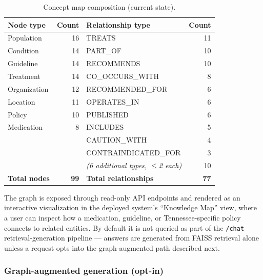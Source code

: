 \documentclass[11pt]{article}
\begin{document}
\begin{table}[h]
\centering
\caption{Concept map composition (current state).}
\label{tab:graph}
\begin{tabular}{lr@{\hspace{2.5em}}lr}
\toprule
Node type & Count & Relationship type & Count \\
\midrule
Population & 16 & TREATS & 11 \\
Condition & 14 & PART\_OF & 10 \\
Guideline & 14 & RECOMMENDS & 10 \\
Treatment & 14 & CO\_OCCURS\_WITH & 8 \\
Organization & 12 & RECOMMENDED\_FOR & 6 \\
Location & 11 & OPERATES\_IN & 6 \\
Policy & 10 & PUBLISHED & 6 \\
Medication & 8 & INCLUDES & 5 \\
 & & CAUTION\_WITH & 4 \\
 & & CONTRAINDICATED\_FOR & 3 \\
 & & \emph{(6 additional types, $\leq$2 each)} & 10 \\
\midrule
\textbf{Total nodes} & \textbf{99} & \textbf{Total relationships} & \textbf{77} \\
\bottomrule
\end{tabular}
\end{table}

The graph is exposed through read-only API endpoints and rendered as an interactive visualization in the deployed system's ``Knowledge Map'' view, where a user can inspect how a medication, guideline, or Tennessee-specific policy connects to related entities. By default it is not queried as part of the \texttt{/chat} retrieval-generation pipeline --- answers are generated from FAISS retrieval alone unless a request opts into the graph-augmented path described next.

\subsubsection*{Graph-augmented generation (opt-in)}
\end{document}
